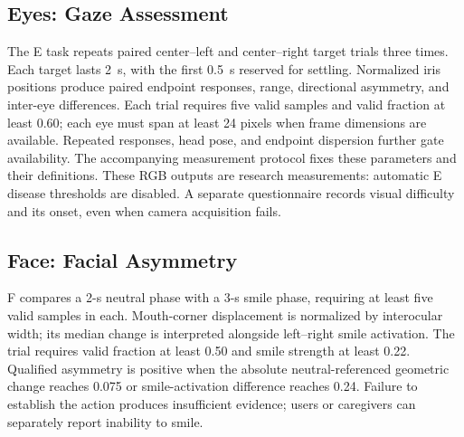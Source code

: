 \subsection{Eyes: Gaze Assessment}
The E task repeats paired center--left and center--right target trials three
times. Each target lasts 2~s, with the first 0.5~s reserved for settling. Normalized iris
positions produce paired endpoint responses, range, directional asymmetry, and
inter-eye differences. Each trial requires five valid samples and valid fraction at least 0.60; each eye must span at least 24 pixels when frame dimensions are available. Repeated responses, head pose, and endpoint dispersion further gate availability. The accompanying measurement protocol fixes these parameters and their definitions. These RGB outputs are
research measurements: automatic E disease thresholds are disabled. A separate
questionnaire records visual difficulty and its onset, even when camera
acquisition fails.

\subsection{Face: Facial Asymmetry}
F compares a 2-s neutral phase with a 3-s smile phase, requiring at least five
valid samples in each. Mouth-corner displacement is normalized
by interocular width; its median change is interpreted alongside left--right
smile activation. The trial requires valid fraction at least 0.50 and smile
strength at least 0.22. Qualified asymmetry is positive when the absolute
neutral-referenced geometric change reaches 0.075 or smile-activation difference
reaches 0.24. Failure to establish the action produces insufficient evidence;
users or caregivers can separately report inability to smile.

